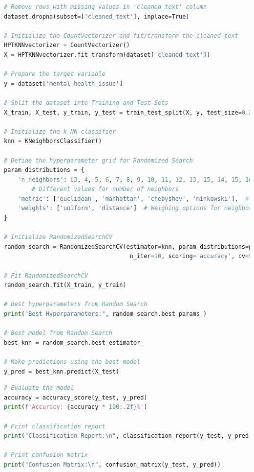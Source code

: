 \begin{tcolorbox}[colback=gray!5!white, colframe=gray!80!black, boxrule=0.5pt, title=K Nearest Neighbours]
    \begin{lstlisting}[language=Python]
# Remove rows with missing values in 'cleaned_text' column
dataset.dropna(subset=['cleaned_text'], inplace=True)

# Initialize the CountVectorizer and fit/transform the cleaned text
HPTKNNvectorizer = CountVectorizer()
X = HPTKNNvectorizer.fit_transform(dataset['cleaned_text'])

# Prepare the target variable
y = dataset['mental_health_issue']

# Split the dataset into Training and Test Sets
X_train, X_test, y_train, y_test = train_test_split(X, y, test_size=0.2, random_state=42)

# Initialize the k-NN classifier
knn = KNeighborsClassifier()

# Define the hyperparameter grid for Randomized Search
param_distributions = {
    'n_neighbors': [3, 4, 5, 6, 7, 8, 9, 10, 11, 12, 13, 15, 14, 15, 16, 17, 18, 19, 20],
        # Different values for number of neighbors
    'metric': ['euclidean', 'manhattan', 'chebyshev', 'minkowski'],  # Different distance metrics
    'weights': ['uniform', 'distance']  # Weighing options for neighbors
}

# Initialize RandomizedSearchCV
random_search = RandomizedSearchCV(estimator=knn, param_distributions=param_distributions,
                                    n_iter=10, scoring='accuracy', cv=5, n_jobs=-1, random_state=42)

# Fit RandomizedSearchCV
random_search.fit(X_train, y_train)

# Best hyperparameters from Random Search
print("Best Hyperparameters:", random_search.best_params_)

# Best model from Random Search
best_knn = random_search.best_estimator_

# Make predictions using the best model
y_pred = best_knn.predict(X_test)
\end{lstlisting}
\end{tcolorbox}

\begin{tcolorbox}[colback=gray!5!white, colframe=gray!80!black, boxrule=0.5pt, title=K Nearest Neighbours]
    \begin{lstlisting}[language=Python]
# Evaluate the model
accuracy = accuracy_score(y_test, y_pred)
print(f'Accuracy: {accuracy * 100:.2f}%')

# Print classification report
print("Classification Report:\n", classification_report(y_test, y_pred))

# Print confusion matrix
print("Confusion Matrix:\n", confusion_matrix(y_test, y_pred))
    \end{lstlisting}
\end{tcolorbox}

